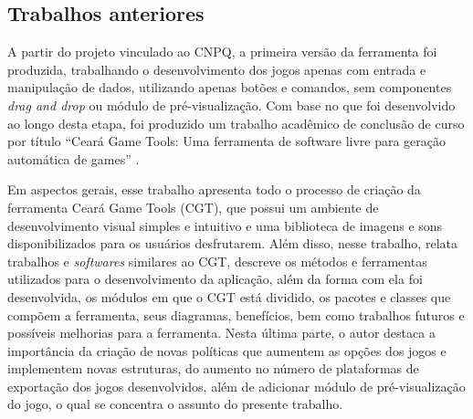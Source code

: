 \documentclass[12pt,twoside,openright,a4paper,english,brazil,sumario=tradicional]{abntex2}
\begin{document}
\subsection{Trabalhos anteriores}
A partir do projeto vinculado ao CNPQ, a primeira versão da ferramenta foi produzida, trabalhando o desenvolvimento dos jogos apenas com entrada e manipulação de dados, utilizando apenas botões e comandos, sem componentes \emph{drag and drop} ou módulo de pré-visualização. Com base no que foi desenvolvido ao longo desta etapa, foi produzido um trabalho acadêmico de conclusão de curso por título “Ceará Game Tools: Uma ferramenta de software livre para geração automática de games” \cite{monografia:aquino}.

Em aspectos gerais, esse trabalho apresenta todo o processo de criação da ferramenta Ceará Game Tools (CGT), que possui um ambiente de desenvolvimento visual simples e intuitivo e uma biblioteca de imagens e sons disponibilizados para os usuários desfrutarem. Além disso, nesse trabalho, relata trabalhos e \emph{softwares} similares ao CGT, descreve os métodos e ferramentas utilizados para o desenvolvimento da aplicação, além da forma com ela foi desenvolvida, os módulos em que o CGT está dividido, os pacotes e classes que compõem a ferramenta, seus diagramas, benefícios, bem como trabalhos futuros e possíveis melhorias para a ferramenta. Nesta última parte, o autor destaca a importância da criação de novas políticas que aumentem as opções dos jogos e implementem novas estruturas, do aumento no número de plataformas de exportação dos jogos desenvolvidos, além de adicionar módulo de pré-visualização do jogo, o qual se concentra o assunto do presente trabalho.
\end{document}
